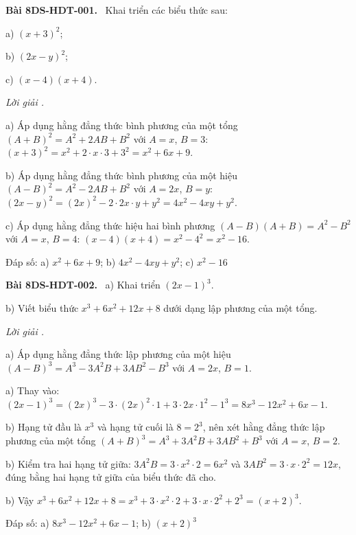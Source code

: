 \documentclass[12pt,a4paper]{article}
\newenvironment{problem}[1][]{\par\medskip\noindent\textbf{Bài #1.}\ }{\par}
\newenvironment{solution}[1][]{\par\noindent\textit{Lời giải #1.}\par}{\par}
\begin{document}
\begin{problem}[8DS-HDT-001]
Khai triển các biểu thức sau:

a) $(x + 3)^2$;

b) $(2x - y)^2$;

c) $(x - 4)(x + 4)$.

\begin{solution}
a) Áp dụng hằng đẳng thức bình phương của một tổng $(A + B)^2 = A^2 + 2AB + B^2$ với $A = x$, $B = 3$: $(x + 3)^2 = x^2 + 2 \cdot x \cdot 3 + 3^2 = x^2 + 6x + 9$.

b) Áp dụng hằng đẳng thức bình phương của một hiệu $(A - B)^2 = A^2 - 2AB + B^2$ với $A = 2x$, $B = y$: $(2x - y)^2 = (2x)^2 - 2 \cdot 2x \cdot y + y^2 = 4x^2 - 4xy + y^2$.

c) Áp dụng hằng đẳng thức hiệu hai bình phương $(A - B)(A + B) = A^2 - B^2$ với $A = x$, $B = 4$: $(x - 4)(x + 4) = x^2 - 4^2 = x^2 - 16$.

Đáp số: a) $\boxed{x^2 + 6x + 9}$; b) $\boxed{4x^2 - 4xy + y^2}$; c) $\boxed{x^2 - 16}$
\end{solution}
\end{problem}

\begin{problem}[8DS-HDT-002]
a) Khai triển $(2x - 1)^3$.

b) Viết biểu thức $x^3 + 6x^2 + 12x + 8$ dưới dạng lập phương của một tổng.

\begin{solution}
a) Áp dụng hằng đẳng thức lập phương của một hiệu $(A - B)^3 = A^3 - 3A^2B + 3AB^2 - B^3$ với $A = 2x$, $B = 1$.

a) Thay vào: $(2x - 1)^3 = (2x)^3 - 3 \cdot (2x)^2 \cdot 1 + 3 \cdot 2x \cdot 1^2 - 1^3 = 8x^3 - 12x^2 + 6x - 1$.

b) Hạng tử đầu là $x^3$ và hạng tử cuối là $8 = 2^3$, nên xét hằng đẳng thức lập phương của một tổng $(A + B)^3 = A^3 + 3A^2B + 3AB^2 + B^3$ với $A = x$, $B = 2$.

b) Kiểm tra hai hạng tử giữa: $3A^2B = 3 \cdot x^2 \cdot 2 = 6x^2$ và $3AB^2 = 3 \cdot x \cdot 2^2 = 12x$, đúng bằng hai hạng tử giữa của biểu thức đã cho.

b) Vậy $x^3 + 6x^2 + 12x + 8 = x^3 + 3 \cdot x^2 \cdot 2 + 3 \cdot x \cdot 2^2 + 2^3 = (x + 2)^3$.

Đáp số: a) $\boxed{8x^3 - 12x^2 + 6x - 1}$; b) $\boxed{(x + 2)^3}$
\end{solution}
\end{problem}
\end{document}
